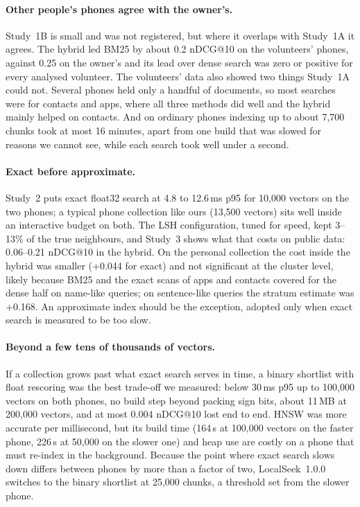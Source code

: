 \documentclass[11pt,a4paper]{article}
\makeatletter
\newcommand{\ndcg}{nDCG@10}
\makeatother
\begin{document}
\paragraph{Other people's phones agree with the owner's.} Study~1B is small and was not registered, but where it overlaps with Study~1A it agrees. The hybrid led BM25 by about 0.2 \ndcg{} on the volunteers' phones, against 0.25 on the owner's and its lead over dense search was zero or positive for every analysed volunteer. The volunteers' data also showed two things Study~1A could not. Several phones held only a handful of documents, so most searches were for contacts and apps, where all three methods did well and the hybrid mainly helped on contacts. And on ordinary phones indexing up to about 7,700 chunks took at most 16 minutes, apart from one build that was slowed for reasons we cannot see, while each search took well under a second.

\paragraph{Exact before approximate.} Study~2 puts exact float32 search at 4.8 to 12.6\,ms p95 for 10,000 vectors on the two phones; a typical phone collection like ours (13,500 vectors) sits well inside an interactive budget on both. The LSH configuration, tuned for speed, kept 3--13\% of the true neighbours, and Study~3 shows what that costs on public data: 0.06--0.21 \ndcg{} in the hybrid. On the personal collection the cost inside the hybrid was smaller (+0.044 for exact) and not significant at the cluster level, likely because BM25 and the exact scans of apps and contacts covered for the dense half on name-like queries; on sentence-like queries the stratum estimate was +0.168. An approximate index should be the exception, adopted only when exact search is measured to be too slow.

\paragraph{Beyond a few tens of thousands of vectors.} If a collection grows past what exact search serves in time, a binary shortlist with float rescoring was the best trade-off we measured: below 30\,ms p95 up to 100,000 vectors on both phones, no build step beyond packing sign bits, about 11\,MB at 200,000 vectors, and at most 0.004 \ndcg{} lost end to end. HNSW was more accurate per millisecond, but its build time (164\,s at 100,000 vectors on the faster phone, 226\,s at 50,000 on the slower one) and heap use are costly on a phone that must re-index in the background. Because the point where exact search slows down differs between phones by more than a factor of two, LocalSeek~1.0.0 switches to the binary shortlist at 25,000 chunks, a threshold set from the slower phone.
\end{document}

